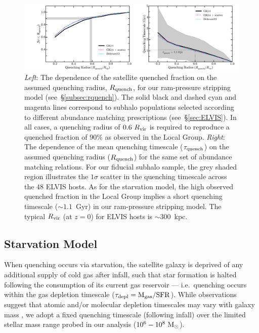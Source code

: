 \documentclass[usenatbib]{mn2e}
\newcommand{\msun}{{\rm M}_{\odot}}
\begin{document}


\begin{figure}
  \centering
  \hspace*{-0.42in}
  \includegraphics[width=7.5in]{f4.pdf}
  \caption{\emph{Left}: The dependence of the satellite quenched
    fraction on the assumed quenching radius, $R_{\rm quench}$, for our
    ram-pressure stripping model (see~\S\ref{subsec:rquench}). The
    solid black and dashed cyan and magenta lines correspond to subhalo
    populations selected according to different abundance matching
    prescriptions (see~\S\ref{sec:ELVIS}). In all cases, a quenching
    radius of $0.6~R_{\rm vir}$ is required to reproduce a quenched
    fraction of $90\%$ as observed in the Local Group. \emph{Right}:
    The dependence of the mean quenching timescale ($\tau_{\rm
      quench}$) on the assumed quenching radius ($R_{\rm quench}$) for
    the same set of abundance matching relations. For our fiducial
    subhalo sample, the grey shaded region illustrates the $1\sigma$
    scatter in the quenching timescale across the $48$ ELVIS hosts. As
    for the starvation model, the high observed quenched fraction in
    the Local Group implies a short quenching timescale ($\sim1.1$~Gyr)
    in our ram-pressure stripping model. The typical $R_{\rm vir}$ (at
    $z=0$) for ELVIS hosts is $\sim300$~kpc.}
  \label{fig:rquench}
\end{figure}



\subsection{Starvation Model}
\label{subsec:tquench}

When quenching occurs via starvation, the satellite galaxy is deprived
of any additional supply of cold gas after infall, such that star
formation is halted following the consumption of its current gas
reservoir --- i.e.~quenching occurs within the gas depletion timescale
($\tau_{\rm depl} = {\rm M}_{\rm gas} / {\rm SFR}$). While
observations suggest that atomic and/or molecular depletion timescales
may vary with galaxy mass \citep{leroy08, bigiel11, boselli14,
  somerville15}, we adopt a fixed quenching timescale (following infall)
over the limited stellar mass range probed in our analysis
($10^{6}-10^{8}~\msun$).
\end{document}
